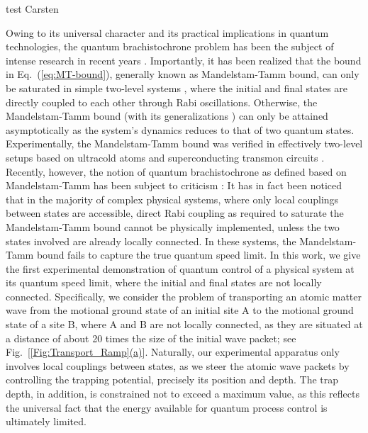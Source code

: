 \documentclass[aps,pra,reprint,a4paper,nofootinbib,superscriptaddress,numbers,longbibliography,showpacs,showkeys,floatfix]{revtex4-1}
\newcommand{\figref}[2]{\hyperref[#1]{\ref{#1}(#2)}} %
\newcommand{\MT}{Mandelstam-Tamm\xspace}
\begin{document}
test Carsten

Owing to its universal character and its practical implications in quantum technologies, the quantum brachistochrone problem has been the subject of intense research in recent years \cite{Deffner:2017a}.
%
Importantly, it has been realized that the bound in Eq.~(\ref{eq:MT-bound}), generally known as Mandelstam-Tamm bound, can only be saturated in simple two-level systems \cite{Uhlmann:2009}, where the initial and final states are directly coupled to each other through Rabi oscillations.
%
Otherwise, the \MT bound (with its generalizations \cite{Margolus:1998}) can only be attained asymptotically \cite{Levitin:2009} as the system's dynamics reduces to that of two quantum states.
%
Experimentally, the \MT bound was verified in effectively two-level setups based on ultracold atoms \cite{Bason:2012} and superconducting transmon circuits \cite{Vepsalainen:2019}.
%
Recently, however, the notion of quantum brachistochrone as defined based on \MT has 
been subject to criticism \cite{Bukov:2019}:
%
It has in fact been noticed that in the majority of complex physical systems, where only local couplings between states are accessible, direct Rabi coupling as required to saturate the \MT bound cannot be physically implemented, unless the two states involved are already locally connected.
%
In these systems, the \MT bound fails to capture the true quantum speed limit.
%
%
%
%
In this work, we give the first experimental demonstration of quantum control of a physical system at its quantum speed limit, where the initial and final states are not locally connected.
%
Specifically, we consider the problem of transporting an atomic matter wave from the motional ground state of an initial site A to the motional ground state of a site B, where A and B are not locally connected, as they are situated at a distance of about 20 times the size of the initial wave packet; see Fig.~[\figref{Fig:Transport_Ramp}{a}].
%
Naturally, our experimental apparatus only involves local couplings between states, as we steer the atomic wave packets by controlling the trapping potential, precisely its position and depth.
%
The trap depth, in addition, is constrained not to exceed a maximum value, as this reflects the universal fact that the energy available for quantum process control is ultimately limited.
%
%
\end{document}

